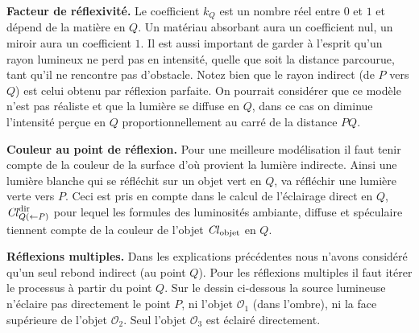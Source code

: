 \documentclass[11pt,class=report,crop=false]{standalone}
\begin{document}
\medskip

 


\medskip

\textbf{Facteur de réflexivité.} Le coefficient $k_Q$ est un nombre réel entre $0$ et $1$ et dépend de la matière en $Q$. Un matériau absorbant aura un coefficient nul, un miroir aura un coefficient $1$.
Il est aussi important de garder à l'esprit qu'un rayon lumineux ne perd pas en intensité, quelle que soit la distance parcourue, tant qu'il ne rencontre pas d'obstacle.
Notez bien que le rayon indirect (de $P$ vers $Q$) est celui obtenu par réflexion parfaite.
On pourrait considérer que ce modèle n'est pas réaliste et que la lumière se diffuse en $Q$,
dans ce cas on diminue l'intensité perçue en $Q$ proportionnellement au carré de la distance $PQ$.

\medskip

\textbf{Couleur au point de réflexion.} 
Pour une meilleure modélisation il faut tenir compte de la couleur de la surface d'où provient la lumière indirecte. Ainsi une lumière blanche qui se réfléchit sur un objet vert en $Q$, va réfléchir une lumière verte vers $P$. Ceci est pris en compte dans le calcul de l'éclairage direct en $Q$, $\operatorname{\it Cl}^{\text{dir}}_{Q(\leftarrow P)}$ pour lequel les formules des luminosités ambiante, diffuse et spéculaire tiennent compte de la couleur de l'objet $\operatorname{\it Cl}_{\text{objet}}$ en $Q$.


\medskip

\textbf{Réflexions multiples.}
Dans les explications précédentes nous n'avons considéré qu'un seul rebond indirect (au point $Q$). Pour les réflexions multiples il faut itérer le processus à partir du point $Q$.
Sur le dessin ci-dessous la source lumineuse n'éclaire pas directement le point $P$, ni l'objet $\mathcal{O}_1$ (dans l'ombre), ni la face supérieure de l'objet $\mathcal{O}_2$. Seul l'objet $\mathcal{O}_3$ est éclairé directement.


\end{document}
